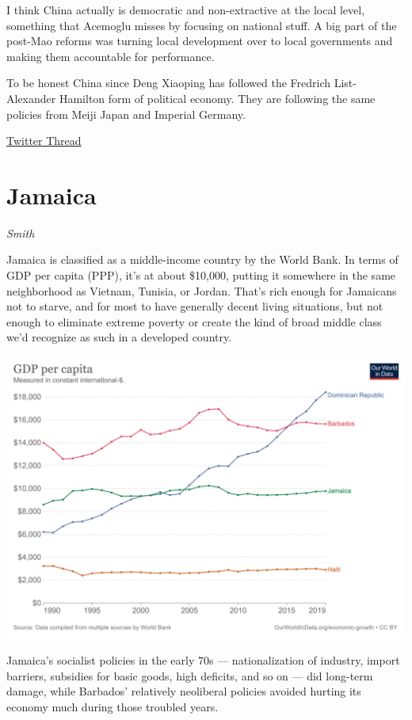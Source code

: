 \documentclass[
]{book}
\begin{document}
I think China actually is democratic and non-extractive at the local level, something that Acemoglu misses by focusing on national stuff. A big part of the post-Mao reforms was turning local development over to local governments and making them accountable for performance.

To be honest China since Deng Xiaoping has followed the Fredrich List- Alexander Hamilton form of political economy. They are following the same policies from Meiji Japan and Imperial Germany.

\href{https://twitter.com/RichardHanania/status/1403124768560205825}{Twitter Thread}

\hypertarget{jamaica}{%
\section{Jamaica}\label{jamaica}}

\emph{Smith}

Jamaica is classified as a middle-income country by the World Bank. In terms of GDP per capita (PPP), it's at about \$10,000, putting it somewhere in the same neighborhood as Vietnam, Tunisia, or Jordan. That's rich enough for Jamaicans not to starve, and for most to have generally decent living situations, but not enough to eliminate extreme poverty or create the kind of broad middle class we'd recognize as such in a developed country.

\includegraphics{fig/Jamaica.png}

Jamaica's socialist policies in the early 70s --- nationalization of industry, import barriers, subsidies for basic goods, high deficits, and so on --- did long-term damage, while Barbados' relatively neoliberal policies avoided hurting its economy much during those troubled years.
\end{document}
